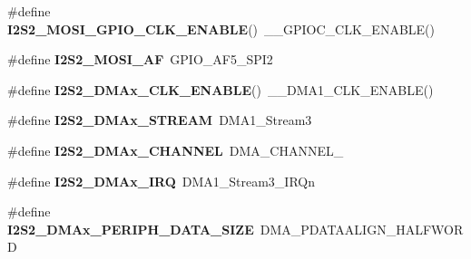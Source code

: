 \begin{DoxyCompactItemize}
\#define {\bfseries I2\+S2\+\_\+\+M\+O\+S\+I\+\_\+\+G\+P\+I\+O\+\_\+\+C\+L\+K\+\_\+\+E\+N\+A\+B\+LE}()~\+\_\+\+\_\+\+G\+P\+I\+O\+C\+\_\+\+C\+L\+K\+\_\+\+E\+N\+A\+B\+LE()
\item 
\mbox{\label{group___s_t_m32_f4___d_i_s_c_o_v_e_r_y___a_u_d_i_o___o_u_t___exported___constants_ga7c470423df4521d2efeddcc185f41efb}} 
\#define {\bfseries I2\+S2\+\_\+\+M\+O\+S\+I\+\_\+\+AF}~G\+P\+I\+O\+\_\+\+A\+F5\+\_\+\+S\+P\+I2
\item 
\mbox{\label{group___s_t_m32_f4___d_i_s_c_o_v_e_r_y___a_u_d_i_o___o_u_t___exported___constants_gaba2cda4d8f632b815fef947c24a92805}} 
\#define {\bfseries I2\+S2\+\_\+\+D\+M\+Ax\+\_\+\+C\+L\+K\+\_\+\+E\+N\+A\+B\+LE}()~\+\_\+\+\_\+\+D\+M\+A1\+\_\+\+C\+L\+K\+\_\+\+E\+N\+A\+B\+LE()
\item 
\mbox{\label{group___s_t_m32_f4___d_i_s_c_o_v_e_r_y___a_u_d_i_o___o_u_t___exported___constants_ga28ffcc33db2cdaea0caec8b235626633}} 
\#define {\bfseries I2\+S2\+\_\+\+D\+M\+Ax\+\_\+\+S\+T\+R\+E\+AM}~D\+M\+A1\+\_\+\+Stream3
\item 
\mbox{\label{group___s_t_m32_f4___d_i_s_c_o_v_e_r_y___a_u_d_i_o___o_u_t___exported___constants_ga33495804a8c2e0bfd331862eaff544ac}} 
\#define {\bfseries I2\+S2\+\_\+\+D\+M\+Ax\+\_\+\+C\+H\+A\+N\+N\+EL}~D\+M\+A\+\_\+\+C\+H\+A\+N\+N\+E\+L\+\_
\item 
\mbox{\label{group___s_t_m32_f4___d_i_s_c_o_v_e_r_y___a_u_d_i_o___o_u_t___exported___constants_ga59604cc7187ac730f4737ea8c64bad71}} 
\#define {\bfseries I2\+S2\+\_\+\+D\+M\+Ax\+\_\+\+I\+RQ}~D\+M\+A1\+\_\+\+Stream3\+\_\+\+I\+R\+Qn
\item 
\mbox{\label{group___s_t_m32_f4___d_i_s_c_o_v_e_r_y___a_u_d_i_o___o_u_t___exported___constants_gabc79cbfa70a030b7c7019a49d72ebddd}} 
\#define {\bfseries I2\+S2\+\_\+\+D\+M\+Ax\+\_\+\+P\+E\+R\+I\+P\+H\+\_\+\+D\+A\+T\+A\+\_\+\+S\+I\+ZE}~D\+M\+A\+\_\+\+P\+D\+A\+T\+A\+A\+L\+I\+G\+N\+\_\+\+H\+A\+L\+F\+W\+O\+RD

\end{DoxyCompactItemize}
